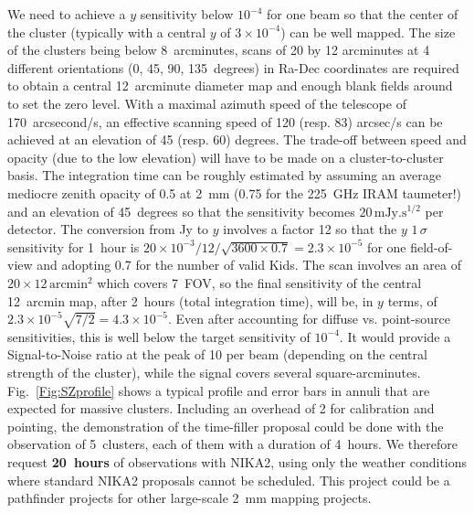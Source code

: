 \documentclass[11pt,a4paper,twoside,graphicx,color]{article}
\begin{document}
We need to achieve a $y$ sensitivity below $10^{-4}$ for one beam so
that the center of the cluster (typically with a central $y$ of
$3\times 10^{-4}$) can be well mapped. The size of the clusters being
below 8~arcminutes, scans of 20 by 12 arcminutes at 4 different
orientations (0, 45, 90, 135~degrees) in Ra-Dec coordinates are
required to obtain a central 12~arcminute diameter map and enough
blank fields around to set the zero level. With a maximal azimuth
speed of the telescope of 170~arcsecond/s, an effective scanning speed
of 120 (resp. 83) arcsec/s can be achieved at an elevation of 45
(resp. 60) degrees. The trade-off between speed and opacity (due to
the low elevation) will have to be made on a cluster-to-cluster
basis. The integration time can be roughly estimated by assuming an
average mediocre zenith opacity of 0.5 at 2~mm (0.75 for the 225~GHz
IRAM taumeter!) and an elevation of 45~degrees so that the sensitivity
becomes $20\,\mathrm{mJy.s^{1/2}}$ per detector. The conversion from
Jy to $y$ involves a factor 12 so that the $y$ $1\,\sigma$ sensitivity
for 1~hour is $20\times 10^{-3}/12/\sqrt{3600\times 0.7}=2.3\times
10^{-5}$ for one field-of-view and adopting 0.7 for the number of
valid Kids. The scan involves an area of $20\times
12\,\mathrm{arcmin^2}$ which covers 7~FOV, so the final sensitivity of
the central 12~arcmin map, after 2~hours (total integration time),
will be, in $y$ terms, of $2.3\times 10^{-5}\sqrt{7/2}=4.3\times
10^{-5}$. Even after accounting for diffuse vs. point-source
sensitivities, this is well below the target sensitivity of
$10^{-4}$. It would provide a Signal-to-Noise ratio at the peak of 10
per beam (depending on the central strength of the cluster), while the
signal covers several square-arcminutes. Fig.~\ref{Fig:SZprofile}
shows a typical profile and error bars in annuli that are expected for
massive clusters. Including an overhead of 2 for calibration and
pointing, the demonstration of the time-filler proposal could be done
with the observation of 5~clusters, each of them with a duration of
4~hours. We therefore request {\bf 20~hours} of observations with
NIKA2, using only the weather conditions where standard NIKA2
proposals cannot be scheduled. This project could be a pathfinder
projects for other large-scale 2~mm mapping projects.
\end{document}
